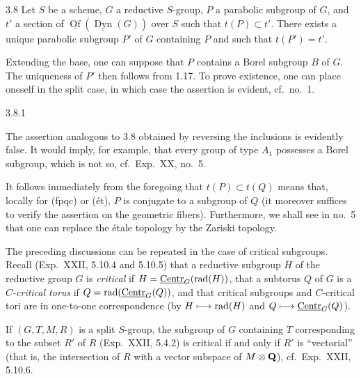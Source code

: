 \begin{lemma}{3.8}\label{XXVI.3.8}
Let $S$ be a scheme, $G$ a reductive $S$-group, $P$ a parabolic subgroup of $G$, and $t'$ a section of $\underline{\operatorname{Of}}(\underline{\operatorname{Dyn}}(G))$ over $S$ such that $t(P)\subset t'$. There exists a unique parabolic subgroup $P'$ of $G$ containing $P$ and such that $t(P')=t'$.
\end{lemma}
Extending the base, one can suppose that $P$ contains a Borel subgroup $B$ of $G$. The uniqueness of $P'$ then follows from 1.17. To prove existence, one can place oneself in the split case, in which case the assertion is evident, cf.~no.~1.
\begin{remarks}{3.8.1}\label{XXVI.3.8.1}
\begin{enumeratei}
\item The assertion analogous to 3.8 obtained by reversing the inclusions is evidently false. It would imply, for example, that every group of type $A_1$ possesses a Borel subgroup, which is not so, cf.~Exp.~XX, no.~5.
\item It follows immediately from the foregoing that $t(P)\subset t(Q)$ means that, locally for (fpqc) or (\'et), $P$ is conjugate to a subgroup of $Q$ (it moreover suffices to verify the assertion on the geometric fibers). Furthermore, we shall see in no.~5 that one can replace the \'etale topology by the Zariski topology.
\end{enumeratei}
\end{remarks}

\label{XXVI.3.9}
The preceding discussions can be repeated in the case of critical subgroups. Recall (Exp.~XXII, 5.10.4 and 5.10.5) that a reductive subgroup $H$ of the reductive group $G$ is \emph{critical} if $H=\underline{\mathrm{Centr}}_G(\operatorname{rad}(H))$, that a subtorus $Q$ of $G$ is a \emph{$C$-critical torus} if $Q=\operatorname{rad}(\underline{\mathrm{Centr}}_G(Q))$, and that critical subgroups and $C$-critical tori are in one-to-one correspondence (by $H\longmapsto\operatorname{rad}(H)$ and $Q\longmapsto\underline{\mathrm{Centr}}_G(Q)$).

If $(G,T,M,R)$ is a split $S$-group, the subgroup of $G$ containing $T$ corresponding to the subset $R'$ of $R$ (Exp.~XXII, 5.4.2) is critical if and only if $R'$ is ``vectorial'' (that is, the intersection of $R$ with a vector subspace of $M\otimes\mathbf{Q}$), cf.~Exp.~XXII, 5.10.6.

